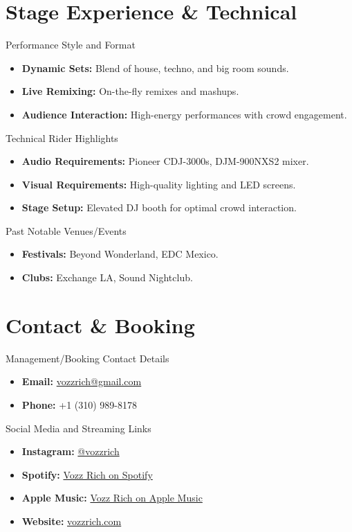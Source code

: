 \documentclass{article}
\begin{document}
\section*{\textcolor{maincolor}{Stage Experience \& Technical}}
    \noindent
    {\Large Performance Style and Format}
    \begin{itemize}[leftmargin=*]
        \item \textbf{Dynamic Sets:} Blend of house, techno, and big room sounds.
        \item \textbf{Live Remixing:} On-the-fly remixes and mashups.
        \item \textbf{Audience Interaction:} High-energy performances with crowd engagement.
    \end{itemize}

    \noindent
    {\Large Technical Rider Highlights}
    \begin{itemize}[leftmargin=*]
        \item \textbf{Audio Requirements:} Pioneer CDJ-3000s, DJM-900NXS2 mixer.
        \item \textbf{Visual Requirements:} High-quality lighting and LED screens.
        \item \textbf{Stage Setup:} Elevated DJ booth for optimal crowd interaction.
    \end{itemize}

    \noindent
    {\Large Past Notable Venues/Events}
    \begin{itemize}[leftmargin=*]
        \item \textbf{Festivals:} Beyond Wonderland, EDC Mexico.
        \item \textbf{Clubs:} Exchange LA, Sound Nightclub.
    \end{itemize}

\section*{\textcolor{maincolor}{Contact \& Booking}}
    \noindent
    {\Large Management/Booking Contact Details}
    \begin{itemize}[leftmargin=*]
        \item \textbf{Email:} \href{mailto:vozzrich@gmail.com}{vozzrich@gmail.com}
        \item \textbf{Phone:} +1 (310) 989-8178
    \end{itemize}

    \noindent
    {\Large Social Media and Streaming Links}
    \begin{itemize}[leftmargin=*]
        \item \textbf{Instagram:} \href{https://instagram.com/vozzrich}{@vozzrich}
        \item \textbf{Spotify:} \href{https://open.spotify.com/artist/27sSKrytmUXukDnMGPXNHQ}{Vozz Rich on Spotify}
        \item \textbf{Apple Music:} \href{https://music.apple.com/us/artist/vozz-rich/1675984686}{Vozz Rich on Apple Music}
        \item \textbf{Website:} \href{https://vozzrich.com/}{vozzrich.com}
    \end{itemize}
\end{document}
